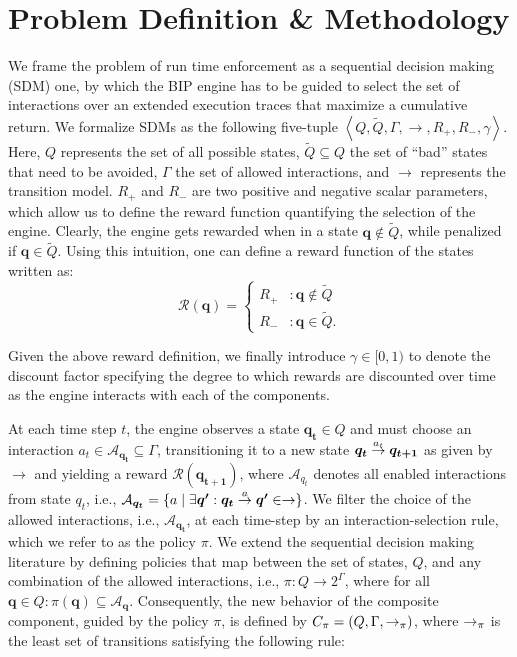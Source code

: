 \section{Problem Definition \& Methodology}
\label{sec:rerl}
We frame the problem of run time enforcement as a sequential decision making (SDM) one, by which the BIP engine has to be guided to select the set of interactions over an extended execution traces that maximize a cumulative return.  We formalize SDMs as the following five-tuple $\left \langle Q, \tilde{Q},\Gamma, \rightarrow, {R}_{+}, {R}_{-}, \gamma \right\rangle$.  Here, $Q$ represents the set of all possible states, $\tilde{Q} \subseteq Q$ the set of ``bad'' states that need to be avoided, $\Gamma$ the set of allowed interactions, and $\rightarrow$ represents the transition model. $R_{+}$ and ${R}_{-}$ are two positive and negative scalar parameters, which allow us to define the reward function quantifying the selection of the engine.
Clearly, the engine gets rewarded when in a state $ \bm{q} \notin \tilde{Q}$, while penalized if $ \bm{q} \in \tilde{Q}$. Using this intuition, one can define a reward function of the states written as: 
%
\begin{displaymath}
   \mathcal{R}( \bm{q}) = \left\{
     \begin{array}{lr}
       R_{+} & :   \bm{q} \notin \tilde{Q} \\
       R_{-} & :  \bm{q} \in \tilde{Q}.
     \end{array}
   \right.
\end{displaymath} 

Given the above reward definition, we finally introduce $\gamma \in [0,1)$ to denote the discount factor specifying the degree to which rewards are discounted over time as the engine interacts with each of the components. 

At each time step $t$, the engine observes a state $ \bm{q_{t}} \in Q$ and must choose an interaction $a_{t} \in \mathcal{A}_{ \bm{q_t}} \subseteq \Gamma$, transitioning it to a new state $ \bm{q_{t}} \goesto[a_{t}] \bm{q_{t+1}}$ as given by $\rightarrow$ and yielding a reward $\mathcal{R}\left( \bm{q_{t+1}}\right)$, where $\mathcal{A}_{q_t}$ denotes all enabled interactions from state  $q_{t}$, i.e., $\mathcal{A}_{ \bm{q_t}} = \{a \mid \exists  \bm{q'}:  \bm{q_{t}} \goesto[a]  \bm{q'} \in \rightarrow\}$. 
We filter the choice of the allowed interactions, i.e., $\mathcal{A}_{ \bm{q_t}}$, at each time-step by an interaction-selection rule, which we refer to as the policy $\pi$. We extend the sequential decision making literature by defining policies that map between the set of states, $Q$, and any combination of the allowed interactions, i.e., $\pi: Q \rightarrow 2^{\Gamma}$, where for all $ \bm{q} \in Q: \pi( \bm{q}) \subseteq\mathcal{A}_{ \bm{q}}$.
Consequently, the new behavior of the composite component, guided by the policy $\pi$, is defined by $C_\pi = (Q, \Gamma, \goesto_\pi)$, where $\goesto_\pi$ is the least set of transitions satisfying the following rule:

